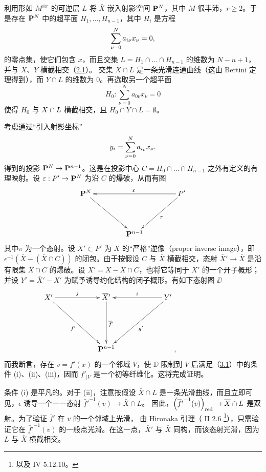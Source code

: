 利用形如 $M^{\otimes r}$ 的可逆层 $L$ 将 $\bar{X}$ 嵌入射影空间 $\PP^N$，其中 $M$ 很丰沛，$r\geq 2$。于是存在 $\PP^N$ 中的超平面 %
$H_1,\ldots, H_{n-1}$，其中 $H_i$ 是方程
$$
\sum^N_{\nu =0}a_{i\nu} x_{\nu} =0{\quoi},
$$
的零点集，使它们包含 $x$，而且交集 $L=H_1\cap\ldots \cap H_{n-1}$ 的维数为 $N-n+1$，并与 $\bar{X}$、$Y$ 横截相交（\hyperref[XI.thm2.1]{2.1}）。
交集 $\bar{X}\cap L$ 是一条光滑连通曲线（这由 Bertini 定理得到），而 $Y\cap L$ 的维数为 $0$。再选取另一个超平面
$$
H_0:\sum^N_{\nu=0}a_{0 \nu}x_{\nu}=0
$$
使得 $H_0$ 与 $\sisi{\bar{X}}{X}\cap L$ 横截相交，且 $H_0\cap Y\cap L=∅$。 %

考虑通过“引入射影坐标”
$$
y_i=\sum^N_{\nu =0}a_{i_{\nu}}x_{\nu}{\quoi}.
$$
得到的投影 $\PP^N\rightarrow \PP^{n-1}$。这是在投影中心 $C=H_0\cap\ldots \cap H_{n-1}$ 之外有定义的有理映射。设 $\epsilon :P'\rightarrow \PP^N$ 为沿 $C$ 的爆破，从而有图
$$
\xymatrix@=1.5cm{
\PP^{N}  \ar[rd]& &P'\ar[ld]^{\pi}\ar[ll]_{\epsilon}\\
               &\PP^{n-1} &
}
$$
其中\pageoriginale $\pi$ 为一个态射。设 $\bar{X}{}'\subset P'$ 为 $\bar{X}$ 的“严格”逆像（proper inverse image），即 $\epsilon^{-1}(\bar{X}-(\bar{X}\cap C))$ 的闭包。由于按假设 $C$ 与 $\bar{X}$ 横截相交，态射 $\bar{X}{}'\rightarrow \bar{X}$ 是沿有限集 $\bar{X}\cap C$ 的爆破。设 $X'=X-\bar{X}\cap C$，也将它等同于 $\bar{X}{}'$ 的一个开子概形；并设 $Y'=\bar{X}{}'-X'$ 为赋予诱导约化结构的闭子概形。有如下态射图 $\DD$
$$
\xymatrix@=2cm{
  X'  \ar[r]^{j} \ar[rd]_{f'}& \bar{X}{}'  \ar[d]^{\bar{f}{}'} & Y'\ar[l]_{i} \ar[ld]^{g'}     &\\
                           & \PP^{n-1} &\qquad ,   
}
$$
而我断言，存在 $v=f'(x)$ 的一个邻域 $V$，使 $\DD$ 限制到 $V$ 后满足（\hyperref[XI.def3.1]{3.1}）中的条件 (i)、(ii)、(iii)，因而 $f'_{\mid V}$ 是一个初等纤维化。这将完成证明。

条件 (i) 是平凡的。对于 (ii)，注意按假设 $\bar{X}\cap L$ 是一条光滑曲线，而且立即可见，$\epsilon$ 诱导一个一一态射 ${\bar{f}{}'}^{-1}(v)\rightarrow \bar{X}\cap L$。
因此，$\left({\bar{f}{}'}^{-1}(v)\right)_{\red}\rightarrow \bar{X}\cap L$ 是双射。为了验证 $\bar{f}{}'$ 在 $v$ 的一个邻域上光滑，
由 Hironaka 引理（ II 2.6 %
\footnote{以及 \EGA IV 5.12.10。}），只需验证它在 ${\bar{f}{}'}^{-1}(v)$ 的一般点光滑。在这一点，$\bar{X}{}'$ 与 $\bar{X}$ 同构，而该态射光滑，因为 $L$ 与 $\bar{X}$ 横截相交。

